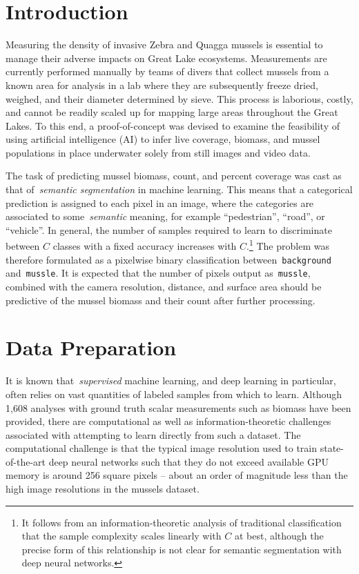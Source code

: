 \documentclass[11pt]{article} %
\begin{document}
\section{Introduction}

Measuring the density of invasive Zebra and Quagga mussels is essential to 
manage their adverse impacts on Great Lake ecosystems. Measurements are
currently performed manually by teams of divers that collect mussels
from a known area for analysis in a lab where they are subsequently freeze 
dried, weighed, and their diameter determined by sieve. This process is 
laborious, costly, and cannot be readily scaled up for mapping large areas 
throughout the Great Lakes. To this end, a proof-of-concept was 
devised to examine the feasibility of using artificial intelligence (AI) to 
infer live coverage, biomass, and mussel populations in place underwater 
solely from still images and video data.

The task of predicting mussel biomass, count, and percent coverage was cast as
that of~\emph{semantic segmentation} in machine learning. This means that a 
categorical prediction is assigned to each pixel in an image, where the
categories are associated to some~\emph{semantic} meaning, for example 
``pedestrian'', ``road'', or ``vehicle''. In general, the number of samples
required to learn to discriminate between $C$ classes with a fixed accuracy 
increases with $C$.\footnote{It follows from an information-theoretic analysis
of traditional classification that the sample complexity scales linearly with
$C$ at best, although the precise form of this relationship is not clear for 
semantic segmentation with deep neural networks.} The problem was therefore
formulated as a pixelwise binary classification between~\texttt{background} 
and~\texttt{mussle}. It is expected that the number of pixels output 
as~\texttt{mussle}, combined with the camera resolution, distance, and surface
area should be predictive of the mussel biomass and their count after 
further processing.

\section{Data Preparation}

It is known that~\emph{supervised} machine learning, and deep learning in 
particular, often relies on vast quantities of labeled samples from which to 
learn. Although 1,608 analyses with ground truth scalar measurements such as 
biomass have been provided, there are computational as well as 
information-theoretic challenges associated with attempting to learn directly 
from such a dataset. 
The computational challenge is that the typical image resolution used to train
state-of-the-art deep neural networks such that they do not exceed available
GPU memory is around 256 square pixels -- about an order of magnitude less than
the high image resolutions in the mussels dataset. 
\end{document}
